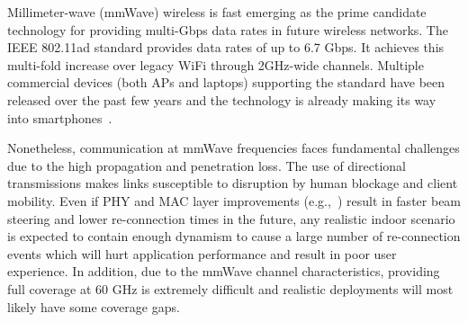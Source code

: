 Millimeter-wave (mmWave) wireless is fast emerging as the prime
candidate technology for providing multi-Gbps data rates in future wireless networks.
The IEEE 802.11ad
standard 
provides data rates of up to 6.7 Gbps. 
It
achieves this multi-fold increase over legacy WiFi through
2GHz-wide channels.
Multiple commercial devices (both APs and laptops) supporting the standard have been
released over the past few years and the technology is already making
its way into smartphones~\cite{peraso_802.11ad,asus_802.11ad}.

Nonetheless, communication at mmWave frequencies faces fundamental
challenges due to the high propagation and penetration loss. %
The use of directional transmissions 
makes
links susceptible to disruption by human blockage and client
mobility. 
Even if PHY and MAC layer
improvements (e.g.,~\cite{nitsche:infocom2015,haider:mobihoc2016,sur:nsdi2016,zhou:infocom2017}) result in faster beam steering and lower re-connection times in the future, any realistic
indoor scenario is expected to contain enough dynamism
to cause a large number of
re-connection events which will hurt application performance and
result in poor user experience.
In addition, due to the mmWave channel characteristics, providing full coverage at 60 GHz 
is extremely difficult and realistic deployments will most likely have some coverage gaps.

